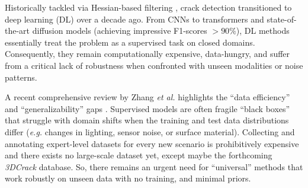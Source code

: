 \documentclass[conference]{IEEEtran}
\begin{document}

Historically tackled via Hessian-based filtering \cite{Frangi1998, Sato1998}, crack detection transitioned to deep learning (DL) over a decade ago. From CNNs \cite{Unet2015, DeepCrack2019} to transformers \cite{CrackFormer2021} and state-of-the-art diffusion models \cite{CrackSegDiff2024} (achieving impressive F1-scores $>90\%$), DL methods essentially treat the problem as a supervised task on closed domains. Consequently, they remain computationally expensive, data-hungry, and suffer from a critical lack of robustness when confronted with unseen modalities or noise patterns. 



A recent comprehensive review by Zhang \textit{et al.}  highlights %
the ``data efficiency'' and ``generalizability'' gaps \cite{Zhang2025Review}. Supervised models are often fragile ``black boxes'' that struggle with domain shifts when the training and test data distributions differ (\textit{e.g.} changes in lighting, sensor noise, or surface material). Collecting and annotating expert-level datasets for every new scenario is prohibitively expensive and there exists no large-scale dataset yet, except maybe the forthcoming \emph{3DCrack} \cite{3DCrack2026, Zhang2025Review} database. So, there remains an urgent need for ``universal'' methods %
that work robustly on unseen data with no training, and minimal priors. 
\end{document}
